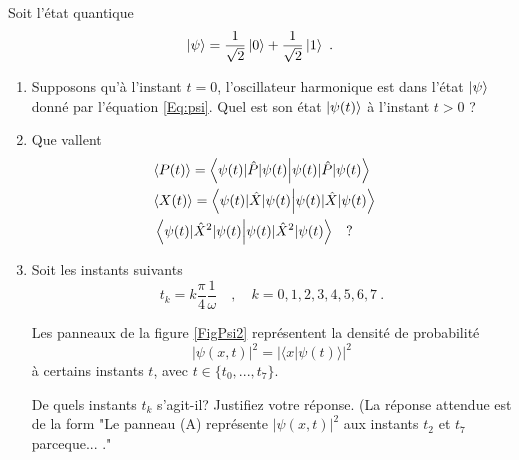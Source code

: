 Soit l'état quantique 
\begin{equation}
\vert \psi \rangle = 
 \frac{1}{\sqrt{2}}\ket{0}  +  \frac{1}{\sqrt{2}}\ket{1}\ .
 \label{Eq:psi}
\end{equation}

\begin{enumerate}


\item 
Supposons qu'à l'instant $t=0$, l'oscillateur harmonique est dans l'état $\ket{\psi}$ donné par l'équation \eqref{Eq:psi}. Quel est son état $\ket{\psi(t)}$ à l'instant $t>0$ ?

\item 
Que vallent 
\begin{eqnarray}
&\langle P(t) \rangle = \braket{\psi (t)|\hat P|\psi(t)}&\\
&\langle X(t) \rangle = \braket{\psi(t)|\hat X|\psi(t)}&\\
&\braket{\psi(t)| \hat X^2 |\psi(t)}\quad  ?&
\end{eqnarray}




\item Soit les instants suivants 
\begin{equation}
t_k= k \frac{\pi}{4} \frac{1}{\omega}\quad , \quad k=0,1,2,3,4,5,6,7 \ .\label{Eq:tk}
\end{equation}


Les panneaux de la figure \ref{FigPsi2} représentent la densité de probabilité 
\begin{equation}
\vert \psi(x,t)\vert^2 = \vert \langle x \vert \psi(t) \rangle \vert^2
\end{equation}
 à certains instants $t$, avec $t \in \{t_0,...,t_7\}$.

De quels instants $t_k$ s'agit-il?   Justifiez votre réponse. 
(La réponse attendue est de la form "Le panneau (A) représente   $ \vert \psi(x,t)\vert^2$ aux instants $t_2$ et $t_7$ parceque... ."



\end{enumerate}
